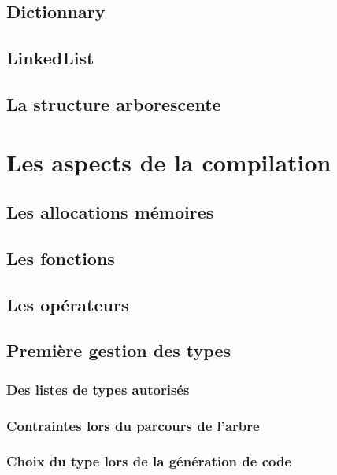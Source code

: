 \documentclass[12pt]{article}
\begin{document}
\subsection{Dictionnary}

\subsection{LinkedList}

\subsection{La structure arborescente}

\section{Les aspects de la compilation}

\subsection{Les allocations mémoires}

\subsection{Les fonctions}

\subsection{Les opérateurs}

\subsection{Première gestion des types}

\subsubsection{Des listes de types autorisés}

\subsubsection{Contraintes lors du parcours de l'arbre}

\subsubsection{Choix du type lors de la génération de code}
\end{document}
